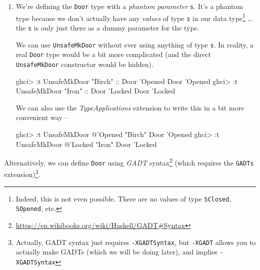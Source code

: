 \documentclass[]{article}
\newenvironment{Shaded}{\begin{snugshade}}{\end{snugshade}}
\newcommand{\CharTok}[1]{\textcolor[rgb]{0.31,0.60,0.02}{#1}}
\newcommand{\DataTypeTok}[1]{\textcolor[rgb]{0.13,0.29,0.53}{#1}}
\newcommand{\FunctionTok}[1]{\textcolor[rgb]{0.00,0.00,0.00}{#1}}
\newcommand{\NormalTok}[1]{#1}
\newcommand{\OtherTok}[1]{\textcolor[rgb]{0.56,0.35,0.01}{#1}}
\newcommand{\StringTok}[1]{\textcolor[rgb]{0.31,0.60,0.02}{#1}}
\renewcommand{\href}[2]{#2\footnote{\url{#1}}}
\begin{document}
\begin{enumerate}
\def\labelenumi{\arabic{enumi}.}
\setcounter{enumi}{2}
\item
  We're defining the \texttt{Door} type with a \emph{phantom parameter}
  \texttt{s}. It's a phantom type because we don't actually have any
  \emph{values} of type \texttt{s} in our data type\footnote{Indeed, this is not
    even possible. There are no values of type
    \texttt{\textquotesingle{}SClosed}, \texttt{\textquotesingle{}SOpened}, etc.}
  \ldots{}the \texttt{s} is only just there as a dummy parameter for the type.

  We can use \texttt{UnsafeMkDoor} without ever using anything of type
  \texttt{s}. In reality, a real \texttt{Door} type would be a bit more
  complicated (and the direct \texttt{UnsafeMkDoor} constructor would be
  hidden).

\begin{Shaded}
\begin{Highlighting}[]
\NormalTok{ghci}\FunctionTok{>} \FunctionTok{:}\NormalTok{t }\DataTypeTok{UnsafeMkDoor} \StringTok{"Birch"}\OtherTok{ ::} \DataTypeTok{Door} \CharTok{'Opened}
\DataTypeTok{Door} \CharTok{'Opened}
\NormalTok{ghci}\FunctionTok{>} \FunctionTok{:}\NormalTok{t }\DataTypeTok{UnsafeMkDoor} \StringTok{"Iron"}\OtherTok{ ::} \DataTypeTok{Door} \CharTok{'Locked}
\DataTypeTok{Door} \CharTok{'Locked}
\end{Highlighting}
\end{Shaded}

  We can also use the \emph{TypeApplications} extension to write this in a bit
  more convenient way --

\begin{Shaded}
\begin{Highlighting}[]
\NormalTok{ghci}\FunctionTok{>} \FunctionTok{:}\NormalTok{t }\DataTypeTok{UnsafeMkDoor} \FunctionTok{@}\CharTok{'Opened "Birch"}
\DataTypeTok{Door} \CharTok{'Opened}
\NormalTok{ghci}\FunctionTok{>} \FunctionTok{:}\NormalTok{t }\DataTypeTok{UnsafeMkDoor} \FunctionTok{@}\CharTok{'Locked "Iron"}
\DataTypeTok{Door} \CharTok{'Locked}
\end{Highlighting}
\end{Shaded}
\end{enumerate}

Alternatively, we can define \texttt{Door} using
\href{https://en.wikibooks.org/wiki/Haskell/GADT\#Syntax}{\emph{GADT} syntax}
(which requires the \texttt{GADTs} extension)\footnote{Actually, GADT syntax
  just requires \texttt{-XGADTSyntax}, but \texttt{-XGADT} allows you to
  actually make GADTs (which we will be doing later), and implies
  \texttt{-XGADTSyntax}}.
\end{document}
